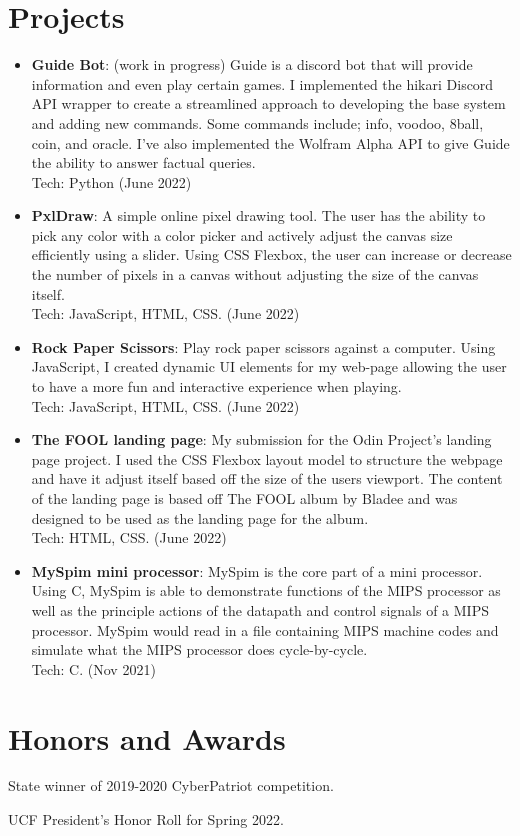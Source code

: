 \documentclass[a4paper,20pt]{article}
\newcommand{\resumeItem}[2]{
  \item\normalsize{
    \textbf{#1}{: #2 \vspace{1pt}}
  }
}
\newcommand{\resumeSubItem}[2]{\resumeItem{#1}{#2}\vspace{1pt}}
\newcommand{\resumeSubHeadingListStart}{\begin{itemize}[leftmargin=*]}
\newcommand{\resumeSubHeadingListEnd}{\end{itemize}}
\begin{document}
    \section{Projects}
        \resumeSubHeadingListStart
            \resumeSubItem{Guide Bot}{(work in progress) Guide is a discord bot that will provide information and even play certain games. I implemented the hikari Discord API wrapper to create a streamlined approach to developing the base system and adding new commands. Some commands include; info, voodoo, 8ball, coin, and oracle. I've also implemented the Wolfram Alpha API to give Guide the ability to answer factual queries.\\Tech: Python (June 2022)}
            \resumeSubItem{PxlDraw}{A simple online pixel drawing tool. The user has the ability to pick any color with a color picker and actively adjust the canvas size efficiently using a slider. Using CSS Flexbox, the user can increase or decrease the number of pixels in a canvas without adjusting the size of the canvas itself.\\Tech: JavaScript, HTML, CSS. (June 2022)}
            \resumeSubItem{Rock Paper Scissors}{Play rock paper scissors against a computer. Using JavaScript, I created dynamic UI elements for my web-page allowing the user to have a more fun and interactive experience when playing.\\Tech: JavaScript, HTML, CSS. (June 2022)}
            \resumeSubItem{The FOOL landing page}{My submission for the Odin Project's landing page project. I used the CSS Flexbox layout model to structure the webpage and have it adjust itself based off the size of the users viewport. The content of the landing page is based off The FOOL album by Bladee and was designed to be used as the landing page for the album.\\Tech: HTML, CSS. (June 2022)}
            \resumeSubItem{MySpim mini processor}{MySpim is the core part of a mini processor. Using C, MySpim is able to demonstrate functions of the MIPS processor as well as the principle actions of the datapath and control signals of a MIPS processor. MySpim would read in a file containing MIPS machine codes and simulate what the MIPS processor does cycle-by-cycle.\\Tech: C. (Nov 2021)}
            \vspace{2pt}
        \resumeSubHeadingListEnd
    
    
    \section{Honors and Awards}
        \begin{description}[font=$\bullet$]
            \item {State winner of 2019-2020 CyberPatriot competition.}
            \item {UCF President's Honor Roll for Spring 2022.}
        \end{description}
        
\end{document}
